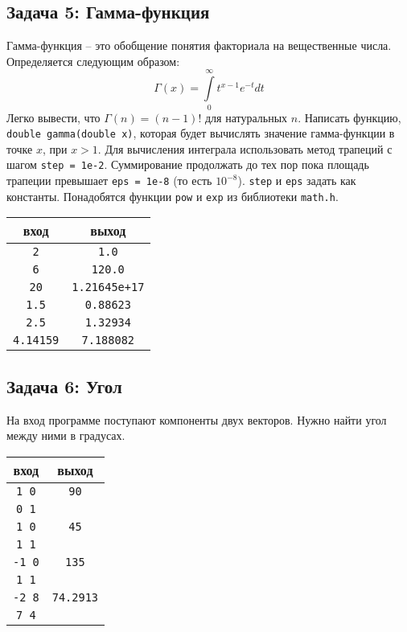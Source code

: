 \documentclass{article}
\begin{document}
\subsection*{Задача 5: Гамма-функция} 
Гамма-функция -- это обобщение понятия факториала на вещественные числа. Определяется следующим образом:
$$
\Gamma \left( x \right) = \int\limits_0^\infty {t^{x - 1} e^{ - t} dt}
$$
Легко вывести, что $\Gamma(n) = (n - 1)!$ для натуральных $n$. Написать функцию, \texttt{double gamma(double x)}, которая будет вычислять значение гамма-функции в точке $x$, при $x > 1$. Для вычисления интеграла использовать метод трапеций с шагом \texttt{step = 1e-2}. Суммирование продолжать до тех пор пока площадь трапеции превышает \texttt{eps = 1e-8} (то есть $10 ^{-8}$). \texttt{step} и \texttt{eps} задать как константы. Понадобятся функции \texttt{pow} и \texttt{exp} из библиотеки \texttt{math.h}.

\begin{center}
\begin{tabular}{ c c }
 вход & выход \\ \hline
 \texttt{2} & \texttt{1.0}  \\ 
 \texttt{6} & \texttt{120.0}  \\
 \texttt{20} & \texttt{1.21645e+17}  \\
 \texttt{1.5} &        \texttt{0.88623} \\
 \texttt{2.5} &        \texttt{1.32934}\\
 \texttt{4.14159} & \texttt{7.188082}\\
\end{tabular}
\end{center}



\subsection*{Задача 6: Угол}
На вход программе поступают компоненты двух векторов. Нужно найти угол между ними в градусах.
\begin{center}
\begin{tabular}{ c c }
 вход & выход \\ \hline
 \texttt{1 0} & \texttt{90}  \\ 
 \texttt{0 1} &   \\ 
 \texttt{1 0} & \texttt{45}  \\ 
 \texttt{1 1} &   \\
 \texttt{-1 0} & \texttt{135}  \\ 
 \texttt{1 1} &   \\
 \texttt{-2 8} & \texttt{74.2913}  \\ 
 \texttt{7 4} &   \\
\end{tabular}
\end{center}
\end{document}
